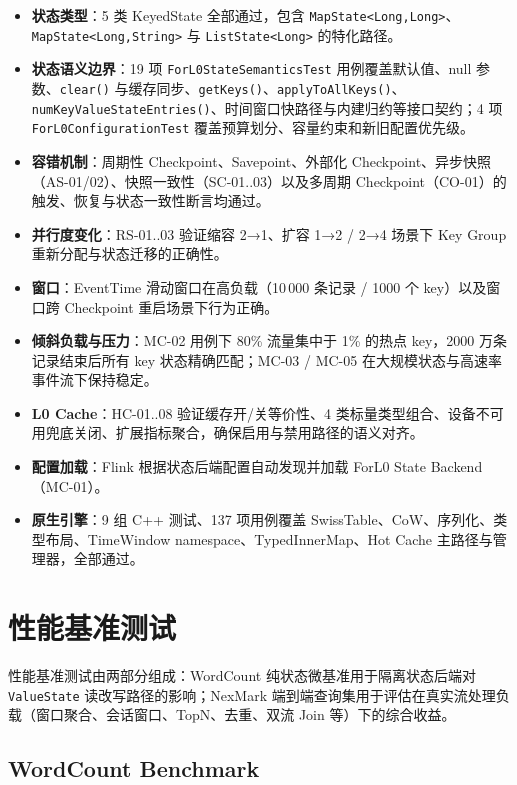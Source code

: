 \documentclass[a4paper,11pt]{article}
\newcommand{\project}{ForL0 State Backend}
\begin{document}
\begin{itemize}
  \item \textbf{状态类型}：5 类 KeyedState 全部通过，包含 \texttt{MapState<Long,Long>}、\texttt{MapState<Long,String>} 与 \texttt{ListState<Long>} 的特化路径。
  \item \textbf{状态语义边界}：19 项 \texttt{ForL0StateSemanticsTest} 用例覆盖默认值、null 参数、\texttt{clear()} 与缓存同步、\texttt{getKeys()}、\texttt{applyToAllKeys()}、\texttt{numKeyValueStateEntries()}、时间窗口快路径与内建归约等接口契约；4 项 \texttt{ForL0ConfigurationTest} 覆盖预算划分、容量约束和新旧配置优先级。
  \item \textbf{容错机制}：周期性 Checkpoint、Savepoint、外部化 Checkpoint、异步快照（AS-01/02）、快照一致性（SC-01..03）以及多周期 Checkpoint（CO-01）的触发、恢复与状态一致性断言均通过。
  \item \textbf{并行度变化}：RS-01..03 验证缩容 2→1、扩容 1→2 / 2→4 场景下 Key Group 重新分配与状态迁移的正确性。
  \item \textbf{窗口}：EventTime 滑动窗口在高负载（10\,000 条记录 / 1000 个 key）以及窗口跨 Checkpoint 重启场景下行为正确。
  \item \textbf{倾斜负载与压力}：MC-02 用例下 80\% 流量集中于 1\% 的热点 key，2000 万条记录结束后所有 key 状态精确匹配；MC-03 / MC-05 在大规模状态与高速率事件流下保持稳定。
  \item \textbf{L0 Cache}：HC-01..08 验证缓存开/关等价性、4 类标量类型组合、设备不可用兜底关闭、扩展指标聚合，确保启用与禁用路径的语义对齐。
  \item \textbf{配置加载}：Flink 根据状态后端配置自动发现并加载 \project{}（MC-01）。
  \item \textbf{原生引擎}：9 组 C++ 测试、137 项用例覆盖 SwissTable、CoW、序列化、类型布局、TimeWindow namespace、TypedInnerMap、Hot Cache 主路径与管理器，全部通过。
\end{itemize}

\section{性能基准测试}

性能基准测试由两部分组成：WordCount 纯状态微基准用于隔离状态后端对 \texttt{ValueState} 读改写路径的影响；NexMark 端到端查询集用于评估在真实流处理负载（窗口聚合、会话窗口、TopN、去重、双流 Join 等）下的综合收益。

\subsection{WordCount Benchmark}
\end{document}
